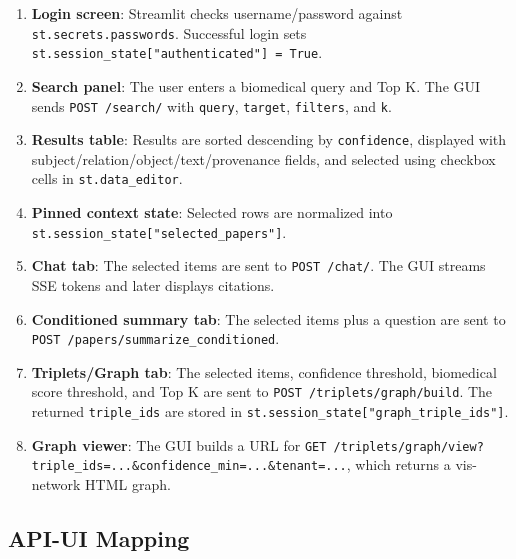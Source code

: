 \documentclass[10pt,letterpaper]{article}
\begin{document}
\begin{enumerate}
\item \textbf{Login screen}: Streamlit checks username/password against \texttt{st.secrets.passwords}. Successful login sets \texttt{st.session\_state["authenticated"] = True}.
\item \textbf{Search panel}: The user enters a biomedical query and Top K. The GUI sends \texttt{POST /search/} with \texttt{query}, \texttt{target}, \texttt{filters}, and \texttt{k}.
\item \textbf{Results table}: Results are sorted descending by \texttt{confidence}, displayed with subject/relation/object/text/provenance fields, and selected using checkbox cells in \texttt{st.data\_editor}.
\item \textbf{Pinned context state}: Selected rows are normalized into \texttt{st.session\_state["selected\_papers"]}.
\item \textbf{Chat tab}: The selected items are sent to \texttt{POST /chat/}. The GUI streams SSE tokens and later displays citations.
\item \textbf{Conditioned summary tab}: The selected items plus a question are sent to \texttt{POST /papers/summarize\_conditioned}.
\item \textbf{Triplets/Graph tab}: The selected items, confidence threshold, biomedical score threshold, and Top K are sent to \texttt{POST /triplets/graph/build}. The returned \texttt{triple\_ids} are stored in \texttt{st.session\_state["graph\_triple\_ids"]}.
\item \textbf{Graph viewer}: The GUI builds a URL for \texttt{GET /triplets/graph/view?triple\_ids=...\&confidence\_min=...\&tenant=...}, which returns a vis-network HTML graph.
\end{enumerate}

\subsection{API-UI Mapping}
\end{document}
